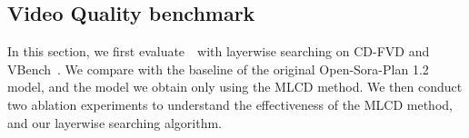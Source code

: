 

\begin{table}[h]
\centering
\caption{\methodname~ with sequence parallelism on Open-Sora-Plan model. Time as wall-clock-time per step.}
\label{tab:flexattention_scaling}
\end{table}

\subsection{Video Quality benchmark}
\label{sec:performance_result}

In this section, we first evaluate~\methodname~with layerwise searching on CD-FVD and VBench~\citep{huang2024vbench, cdfvd}. We compare with the baseline of the original Open-Sora-Plan 1.2 model, and the model we obtain only using the MLCD method. We then conduct two ablation experiments to understand the effectiveness of the MLCD method, and our layerwise searching algorithm.


